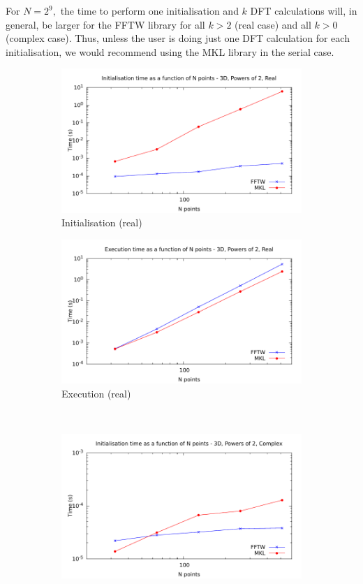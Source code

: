 \documentclass[12pt, a4paper]{article} \setlength{\textheight}{24cm}
\begin{document}
For $N=2^9,$ the time to perform one initialisation and $k$ DFT
calculations will, in general, be larger for the FFTW library for all
$k>2$ (real case) and all $k>0$ (complex case). Thus, unless the user
is doing just one DFT calculation for each initialisation, we would
recommend using the MKL library in the serial case.

\begin{figure}[H]
  \centering
  \begin{subfigure}{.5\textwidth}
    \centering
    \includegraphics[width=.9\linewidth]{graphs/3d-pow2-init-r.pdf}
    \caption{Initialisation (real)}
    \label{3DPOW2RI}
  \end{subfigure}%
  \begin{subfigure}{.5\textwidth}
    \centering
    \includegraphics[width=.9\linewidth]{graphs/3d-pow2-exec-r.pdf}
    \caption{Execution (real)}
    \label{3DPOW2R}
  \end{subfigure}\\
  \begin{subfigure}{.5\textwidth}
    \centering
    \includegraphics[width=.9\linewidth]{graphs/3d-pow2-init-c.pdf}

\end{subfigure}
\end{figure}
\end{document}

